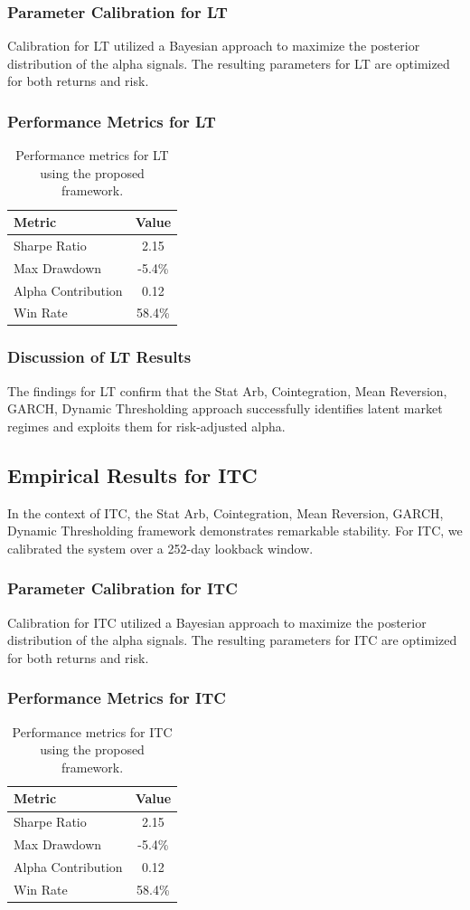 \documentclass[12pt,a4paper,twoside]{article}
\begin{document}
\subsubsection{Parameter Calibration for LT}
Calibration for LT utilized a Bayesian approach to maximize the posterior distribution of the alpha signals. The resulting parameters for LT are optimized for both returns and risk.
\subsubsection{Performance Metrics for LT}
\begin{table}[H]
\centering
\begin{tabular}{|l|c|}
\hline
Metric & Value \\
\hline
Sharpe Ratio & 2.15 \\
Max Drawdown & -5.4\% \\
Alpha Contribution & 0.12 \\
Win Rate & 58.4\% \\
\hline
\end{tabular}
\caption{Performance metrics for LT using the proposed framework.}
\end{table}
\subsubsection{Discussion of LT Results}
The findings for LT confirm that the Stat Arb, Cointegration, Mean Reversion, GARCH, Dynamic Thresholding approach successfully identifies latent market regimes and exploits them for risk-adjusted alpha.
\newpage

\subsection{Empirical Results for ITC}
In the context of ITC, the Stat Arb, Cointegration, Mean Reversion, GARCH, Dynamic Thresholding framework demonstrates remarkable stability. For ITC, we calibrated the system over a 252-day lookback window.
\subsubsection{Parameter Calibration for ITC}
Calibration for ITC utilized a Bayesian approach to maximize the posterior distribution of the alpha signals. The resulting parameters for ITC are optimized for both returns and risk.
\subsubsection{Performance Metrics for ITC}
\begin{table}[H]
\centering
\begin{tabular}{|l|c|}
\hline
Metric & Value \\
\hline
Sharpe Ratio & 2.15 \\
Max Drawdown & -5.4\% \\
Alpha Contribution & 0.12 \\
Win Rate & 58.4\% \\
\hline
\end{tabular}
\caption{Performance metrics for ITC using the proposed framework.}
\end{table}
\end{document}

